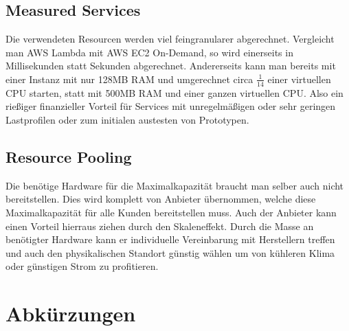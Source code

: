 \documentclass[12pt, a4paper]{article}
\begin{document}
\subsection{Measured Services}
Die verwendeten Resourcen werden viel feingranularer abgerechnet.
Vergleicht man AWS Lambda mit AWS EC2 On-Demand, so wird einerseits in Millisekunden statt Sekunden abgerechnet.
Andererseits kann man bereits mit einer Instanz mit nur 128MB RAM und umgerechnet circa \(\frac{1}{14}\) einer virtuellen CPU starten, statt mit 500MB RAM und einer ganzen virtuellen CPU.
Also ein rießiger finanzieller Vorteil für Services mit unregelmäßigen oder sehr geringen Lastprofilen oder zum initialen austesten von Prototypen.

\subsection{Resource Pooling}
Die benötige Hardware für die Maximalkapazität braucht man selber auch nicht bereitstellen.
Dies wird komplett von Anbieter übernommen, welche diese Maximalkapazität für alle Kunden bereitstellen muss.
Auch der Anbieter kann einen Vorteil hierraus ziehen durch den Skaleneffekt.
Durch die Masse an benötigter Hardware kann er individuelle Vereinbarung mit Herstellern treffen und auch den physikalischen Standort günstig wählen um von kühleren Klima oder günstigen Strom zu profitieren.

\newpage

\section{Abkürzungen}
\begin{acronym}
\end{acronym}
\newpage



\end{document}
